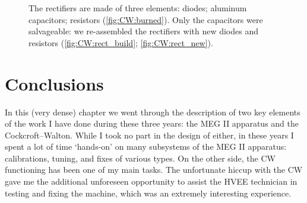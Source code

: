 \begin{refsection}
\begin{figure}[ht]
        \hfill
        \caption{The rectifiers are made of three elements: diodes; aluminum capacitors; resistors (\ref{fig:CW:burned}). Only the capacitors were salvageable: we re-assembled the rectifiers with new diodes and resistors (\ref{fig:CW:rect_build}; \ref{fig:CW:rect_new}).}
        \label{fig:CW:fixed}
    \end{figure}

\section{Conclusions}
In this (very dense) chapter we went through the description of two key elements of the work I have done during these three years: the MEG II apparatus and the Cockcroft–Walton.
While I took no part in the design of either, in these years I spent a lot of time `hands-on' on many subsystems of the MEG II apparatus: calibrations, tuning, and fixes of various types.
On the other side, the CW functioning has been one of my main tasks.
The unfortunate hiccup with the CW gave me the additional unforeseen opportunity to assist the HVEE technician in testing and fixing the machine, which was an extremely interesting experience. 

\printbibliography[
    heading = bibliographychapter,
    title=Bibliography on MEG II
]

\end{refsection}
